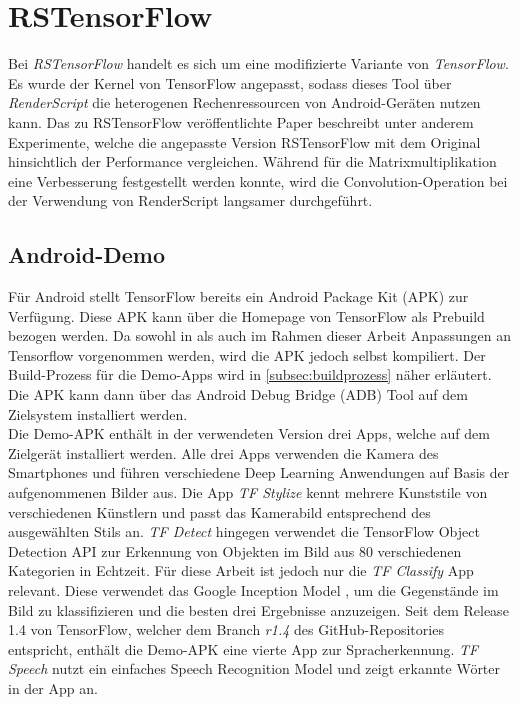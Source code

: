 \section{RSTensorFlow}
\label{sec:rstensorflow}
Bei \textit{RSTensorFlow} handelt es sich um eine modifizierte Variante von \textit{TensorFlow}. Es wurde der Kernel von TensorFlow angepasst, sodass dieses Tool über \textit{RenderScript} die heterogenen Rechenressourcen von Android-Geräten nutzen kann. Das zu RSTensorFlow veröffentlichte Paper \cite{rstensorflow2017} beschreibt unter anderem Experimente, welche die angepasste Version RSTensorFlow mit dem Original hinsichtlich der Performance vergleichen. Während für die Matrixmultiplikation eine Verbesserung festgestellt werden konnte, wird die Convolution-Operation bei der Verwendung von RenderScript langsamer durchgeführt. 

\subsection{Android-Demo}
\label{subsec:androiddemo}
Für Android stellt TensorFlow bereits ein Android Package Kit (APK) zur Verfügung. Diese APK kann über die Homepage von TensorFlow \cite{tensorflow} als Prebuild bezogen werden. Da sowohl in \cite{rstensorflow2017} als auch im Rahmen dieser Arbeit Anpassungen an Tensorflow vorgenommen werden, wird die APK jedoch selbst kompiliert. Der Build-Prozess für die Demo-Apps wird in \ref{subsec:buildprozess} näher erläutert. Die APK kann dann über das Android Debug Bridge (ADB) Tool auf dem Zielsystem installiert werden. 
\\
Die Demo-APK enthält in der verwendeten Version drei Apps, welche auf dem Zielgerät installiert werden. Alle drei Apps verwenden die Kamera des Smartphones und führen verschiedene Deep Learning Anwendungen auf Basis der aufgenommenen Bilder aus. Die App \textit{TF Stylize} kennt mehrere Kunststile von verschiedenen Künstlern und passt das Kamerabild entsprechend des ausgewählten Stils an. \textit{TF Detect} hingegen verwendet die TensorFlow Object Detection API zur Erkennung von Objekten im Bild aus 80 verschiedenen Kategorien in Echtzeit. Für diese Arbeit ist jedoch nur die \textit{TF Classify} App relevant. Diese verwendet das Google Inception Model \cite{googleinception}, um die Gegenstände im Bild zu klassifizieren und die besten drei Ergebnisse anzuzeigen. 
Seit dem Release 1.4 von TensorFlow, welcher dem Branch \textit{r1.4} des GitHub-Repositories \cite{tensorflowgithub} entspricht, enthält die Demo-APK eine vierte App zur Spracherkennung. \textit{TF Speech} nutzt ein einfaches Speech Recognition Model und zeigt erkannte Wörter in der App an.

